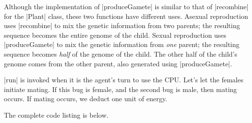 Although the implementation of |produceGamete| is similar to that
of |recombine| for the |Plant| class, 
these two functions have different uses.
Asexual reproduction uses |recombine| to mix the genetic
information from two parents;
the resulting sequence becomes the entire genome of the child.
Sexual reproduction uses |produceGamete| to mix the genetic information
from \emph{one} parent;
the resulting sequence becomes \emph{half} of the genome of the child.
The other half of the child's genome comes from the other parent,
also generated using |produceGamete|.

|run| is invoked when it is the agent's turn to use the CPU.
Let's let the females initiate mating.
If this bug is female, and the second bug is male, then mating occurs.
If mating occurs, we deduct one unit of energy.


The complete code listing is below.


